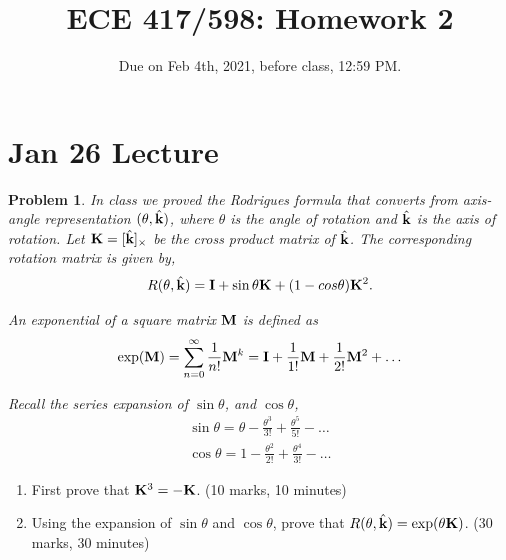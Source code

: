 \documentclass[twocolumn]{article}
\title{ECE 417/598: Homework 2}
\date{Due on Feb 4th, 2021, before class, 12:59 PM.}
\newtheorem{prob}{Problem}
\begin{document}
\maketitle
\section{Jan 26 Lecture}

\begin{prob}
  In class we proved the Rodrigues formula that converts from axis-angle
  representation $(\theta, \hat{\mathbf{k}})$, where $\theta$ is the angle of rotation
  and $\hat{\mathbf{k}}$ is the axis of rotation. Let $\mathbf{K} = [\hat{\mathbf{k}}]_{\times}$ be
  the cross product matrix of $\hat{\mathbf{k}}$. The corresponding rotation matrix is
  given by,
  \begin{align}
    R(\theta, \hat{\mathbf{k}}) = \mathbf{I} + \sin \theta \mathbf{K} + (1-cos \theta) \mathbf{K}^2.
  \end{align}

  An exponential of a square matrix $\mathbf{M}$ is defined as
  \begin{align}
    \exp(\mathbf{M}) = \sum_{n=0}^\infty \frac{1}{n!} \mathbf{M}^k = \mathbf{I} + \frac{1}{1!}\mathbf{M} + \frac{1}{2!}\mathbf{M}^2 + \dots
  \end{align}

  Recall the series expansion of $\sin \theta$, and $\cos \theta$,
  \begin{align}
    \sin \theta = \theta - \frac{\theta^3}{3!} + \frac{\theta^5}{5!} - \dots
    \\
    \cos \theta = 1 - \frac{\theta^2}{2!} + \frac{\theta^4}{3!} - \dots
  \end{align}
\end{prob}

  \begin{enumerate}
   \item First prove that $\mathbf{K}^3 = - \mathbf{K}$. (10 marks, 10 minutes)
   \item Using the expansion of $\sin\theta$ and $\cos\theta$, prove that
     $R(\theta, \hat{\mathbf{k}}) = \exp(\theta \mathbf{K})$. (30 marks, 30 minutes)
  \end{enumerate}
\end{document}
